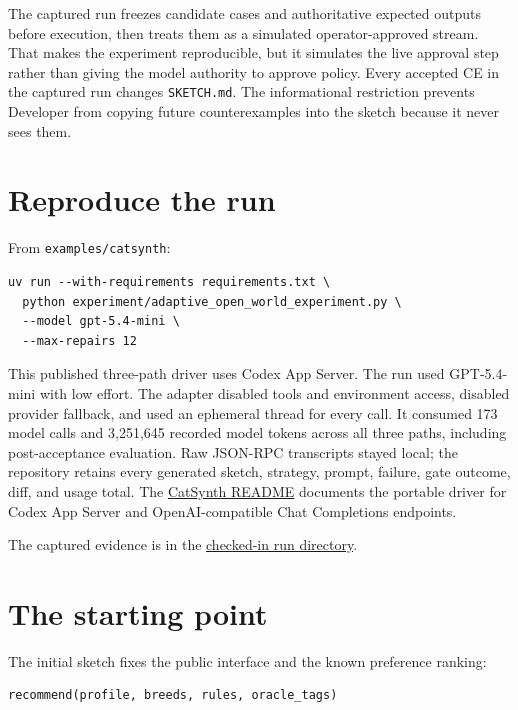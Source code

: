 The captured run freezes candidate cases and authoritative expected outputs before execution,
then treats them as a simulated operator-approved stream. That makes the experiment
reproducible, but it simulates the live approval step rather than giving the model authority to
approve policy. Every accepted CE in the captured run changes \texttt{SKETCH.md}. The informational
restriction prevents Developer from copying future counterexamples into the sketch because it
never sees them.

\section{Reproduce the run}\label{reproduce-the-run}

From \texttt{examples/catsynth}:

\begin{verbatim}
uv run --with-requirements requirements.txt \
  python experiment/adaptive_open_world_experiment.py \
  --model gpt-5.4-mini \
  --max-repairs 12
\end{verbatim}

This published three-path driver uses Codex App Server. The run used GPT-5.4-mini with low effort.
The adapter disabled tools and environment access, disabled provider fallback, and used an
ephemeral thread for every call. It consumed 173 model calls and 3,251,645 recorded model tokens
across all three paths, including post-acceptance evaluation. Raw JSON-RPC transcripts stayed
local; the repository retains every generated sketch, strategy, prompt, failure, gate outcome,
diff, and usage total. The \href{https://github.com/open-horizon-labs/counterexample-supplemented-sketches/tree/main/examples/catsynth}{CatSynth README}
documents the portable driver for Codex App Server and OpenAI-compatible Chat Completions
endpoints.

The captured evidence is in the
\href{https://github.com/open-horizon-labs/counterexample-supplemented-sketches/tree/main/examples/catsynth/experiment/results/gpt-5.4-mini-adaptive-open-world-v2-20260712}{checked-in run directory}.

\section{The starting point}\label{the-starting-point}

The initial sketch fixes the public interface and the known preference ranking:

\begin{verbatim}
recommend(profile, breeds, rules, oracle_tags)
\end{verbatim}

